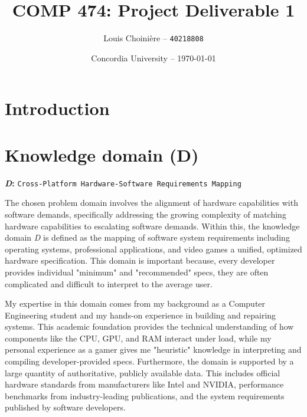 \documentclass{article}
\title{COMP 474: Project Deliverable 1}
\author{Louis Choinière -- \texttt{40218808}}
\date{Concordia University -- \today}
\begin{document}
\maketitle %


\section*{Introduction} %




\section{Knowledge domain (D)} %

\textbf{\textit{D}:} \texttt{Cross-Platform Hardware-Software Requirements Mapping}

The chosen problem domain involves the alignment of hardware capabilities with software demands, specifically addressing the growing complexity of matching hardware capabilities to escalating software demands. Within this, the knowledge domain \textit{D} is defined as the mapping of software system requirements including operating systems, professional applications, and video games a unified, optimized hardware specification. This domain is important because, every developer provides individual "minimum" and "recommended" specs, they are often complicated and difficult to interpret to the average user.

My expertise in this domain comes from my background as a Computer Engineering student and my hands-on experience in building and repairing systems. This academic foundation provides the technical understanding of how components like the CPU, GPU, and RAM interact under load, while my personal experience as a gamer gives me "heuristic" knowledge in interpreting and compiling developer-provided specs. Furthermore, the domain is supported by a large quantity of authoritative, publicly available data. This includes official hardware standards from manufacturers like Intel and NVIDIA, performance benchmarks from industry-leading publications, and the system requirements published by software developers.
\end{document}

